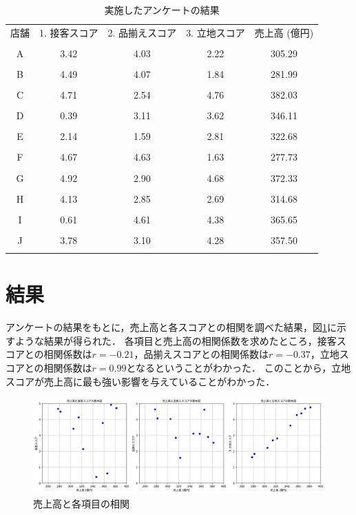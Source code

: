 \documentclass[uplatex]{jsarticle}
\begin{document}
\begin{table}[H]
    \centering
    \caption{実施したアンケートの結果}
    \label{table:anket_result}
    \begin{tabular}{ccccc}
        \hline
        店舗 & 1. 接客スコア & 2. 品揃えスコア & 3. 立地スコア & 売上高 (億円) \\\\ \hline
        A & 3.42 & 4.03 & 2.22 & 305.29 \\\\ \hline
        B & 4.49 & 4.07 & 1.84 & 281.99 \\\\ \hline
        C & 4.71 & 2.54 & 4.76 & 382.03 \\\\ \hline
        D & 0.39 & 3.11 & 3.62 & 346.11 \\\\ \hline
        E & 2.14 & 1.59 & 2.81 & 322.68 \\\\ \hline
        F & 4.67 & 4.63 & 1.63 & 277.73 \\\\ \hline
        G & 4.92 & 2.90 & 4.68 & 372.33 \\\\ \hline
        H & 4.13 & 2.85 & 2.69 & 314.68 \\\\ \hline
        I & 0.61 & 4.61 & 4.38 & 365.65 \\\\ \hline
        J & 3.78 & 3.10 & 4.28 & 357.50 \\\\ \hline
    \end{tabular}
\end{table}

\section{結果}
アンケートの結果をもとに，売上高と各スコアとの相関を調べた結果，図\ref{fig:correlation}に示すような結果が得られた．
各項目と売上高の相関係数を求めたところ，接客スコアとの相関係数は$r=-0.21$，品揃えスコアとの相関係数は$r=-0.37$，立地スコアとの相関係数は$r=0.99$となるということがわかった．
このことから，立地スコアが売上高に最も強い影響を与えていることがわかった．


\begin{figure}[H]
    \centering
    \includegraphics[width=1\textwidth]{graph/csv_graph.png}
    \caption{売上高と各項目の相関}
    \label{fig:correlation}
\end{figure}
\end{document}
